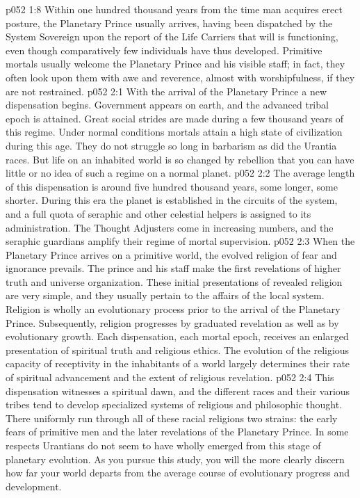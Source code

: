 \pc \vs p052 1:8 Within one hundred thousand years from the time man acquires erect posture, the Planetary Prince usually arrives, having been dispatched by the System Sovereign upon the report of the Life Carriers that will is functioning, even though comparatively few individuals have thus developed. Primitive mortals usually welcome the Planetary Prince and his visible staff; in fact, they often look upon them with awe and reverence, almost with worshipfulness, if they are not restrained.\plusone
{}
\vs p052 2:1 With the arrival of the Planetary Prince a new dispensation begins. Government appears on earth, and the advanced tribal epoch is attained. Great social strides are made during a few thousand years of this regime. Under normal conditions mortals attain a high state of civilization during this age. They do not struggle so long in barbarism as did the Urantia races. But life on an inhabited world is so changed by rebellion that you can have little or no idea of such a regime on a normal planet.
\vs p052 2:2 The average length of this dispensation is around five hundred thousand years, some longer, some shorter. During this era the planet is established in the circuits of the system, and a full quota of seraphic and other celestial helpers is assigned to its administration. The Thought Adjusters come in increasing numbers, and the seraphic guardians amplify their regime of mortal supervision.
\vs p052 2:3 When the Planetary Prince arrives on a primitive world, the evolved religion of fear and ignorance prevails. The prince and his staff make the first revelations of higher truth and universe organization. These initial presentations of revealed religion are very simple, and they usually pertain to the affairs of the local system. Religion is wholly an evolutionary process prior to the arrival of the Planetary Prince. Subsequently, religion progresses by graduated revelation as well as by evolutionary growth. Each dispensation, each mortal epoch, receives an enlarged presentation of spiritual truth and religious ethics. The evolution of the religious capacity of receptivity in the inhabitants of a world largely determines their rate of spiritual advancement and the extent of religious revelation.
\vs p052 2:4 This dispensation witnesses a spiritual dawn, and the different races and their various tribes tend to develop specialized systems of religious and philosophic thought. There uniformly run through all of these racial religions two strains: the early fears of primitive men and the later revelations of the Planetary Prince. In some respects Urantians do not seem to have wholly emerged from this stage of planetary evolution. As you pursue this study, you will the more clearly discern how far your world departs from the average course of evolutionary progress and development.
